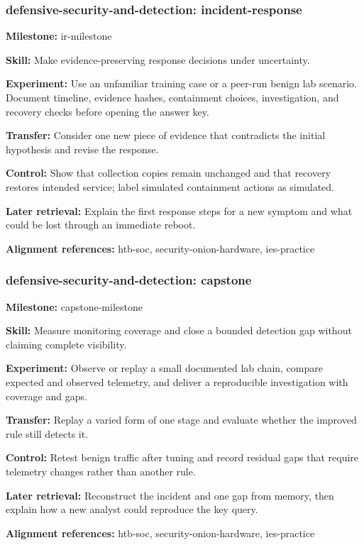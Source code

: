 \subsubsection{defensive-security-and-detection: incident-response}
\noindent\textbf{Milestone:} ir-milestone\par
\noindent\textbf{Skill:} Make evidence-preserving response decisions under uncertainty.\par
\noindent\textbf{Experiment:} Use an unfamiliar training case or a peer-run benign lab scenario. Document timeline, evidence hashes, containment choices, investigation, and recovery checks before opening the answer key.\par
\noindent\textbf{Transfer:} Consider one new piece of evidence that contradicts the initial hypothesis and revise the response.\par
\noindent\textbf{Control:} Show that collection copies remain unchanged and that recovery restores intended service; label simulated containment actions as simulated.\par
\noindent\textbf{Later retrieval:} Explain the first response steps for a new symptom and what could be lost through an immediate reboot.\par
\noindent\textbf{Alignment references:} htb-soc, security-onion-hardware, ies-practice\par
\subsubsection{defensive-security-and-detection: capstone}
\noindent\textbf{Milestone:} capstone-milestone\par
\noindent\textbf{Skill:} Measure monitoring coverage and close a bounded detection gap without claiming complete visibility.\par
\noindent\textbf{Experiment:} Observe or replay a small documented lab chain, compare expected and observed telemetry, and deliver a reproducible investigation with coverage and gaps.\par
\noindent\textbf{Transfer:} Replay a varied form of one stage and evaluate whether the improved rule still detects it.\par
\noindent\textbf{Control:} Retest benign traffic after tuning and record residual gaps that require telemetry changes rather than another rule.\par
\noindent\textbf{Later retrieval:} Reconstruct the incident and one gap from memory, then explain how a new analyst could reproduce the key query.\par
\noindent\textbf{Alignment references:} htb-soc, security-onion-hardware, ies-practice\par
